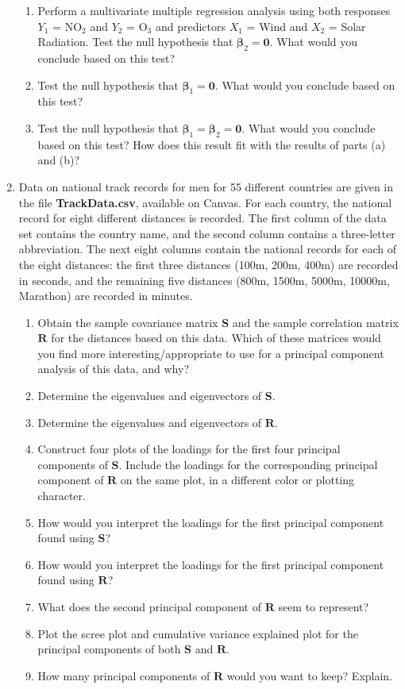 \documentclass{article}
\theoremstyle{plain}
\theoremstyle{definition}
\theoremstyle{remark}
\begin{document}
\begin{enumerate}
\begin{enumerate}
\item Perform a multivariate multiple regression analysis using both responses $Y_1$ = NO$_2$ and $Y_2$ = O$_3$ and predictors $X_1$ = Wind and $X_2$ = Solar Radiation. Test the null hypothesis that $\bm{\beta}_2 = \mathbf{0}$.  What would you conclude based on this test?
\item Test the null hypothesis that $\bm{\beta}_1 = \mathbf{0}$.  What would you conclude based on this test?
\item Test the null hypothesis that $\bm{\beta}_1 = \bm{\beta}_2 = \mathbf{0}$.  What would you conclude based on this test? How does this result fit with the results of parts (a) and (b)?
\end{enumerate}

\item Data on national track records for men for 55 different countries are given in the file \textbf{TrackData.csv}, available on Canvas.   For each country, the national record for eight different distances is recorded.  The first column of the data set contains the country name, and the second column contains a three-letter abbreviation.  The next eight columns contain the national records for each of the eight distances: the first three distances (100m, 200m, 400m) are recorded in seconds, and the remaining five distances (800m, 1500m, 5000m, 10000m, Marathon) are recorded in minutes.

\begin{enumerate}
\item Obtain the sample covariance matrix $\mathbf{S}$ and the sample correlation matrix $\mathbf{R}$ for the distances based on this data.  Which of these matrices would you find more interesting/appropriate to use for a principal component analysis of this data, and why?
\item Determine the eigenvalues and eigenvectors of $\mathbf{S}$.
\item Determine the eigenvalues and eigenvectors of $\mathbf{R}$.
\item Construct four plots of the loadings for the first four principal components of $\mathbf{S}$.  Include the loadings for the corresponding principal component of $\mathbf{R}$ on the same plot, in a different color or plotting character.
\item How would you interpret the loadings for the first principal component found using $\mathbf{S}$? 
\item How would you interpret the loadings for the first principal component found using $\mathbf{R}$?
\item What does the second principal component of $\mathbf{R}$ seem to represent?
\item Plot the scree plot and cumulative variance explained plot for the principal components of both $\mathbf{S}$ and $\mathbf{R}$.
\item How many principal components of $\mathbf{R}$ would you want to keep? Explain.
\end{enumerate}


\end{enumerate}
\end{document}
